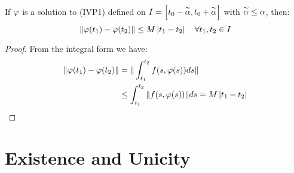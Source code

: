 
\begin{proposition}[]
If $\varphi  $ is a solution to (IVP1) defined on $I = \left[ t_0 - \overset{\sim}{\alpha} , t_0  + \overset{\sim}{\alpha}  \right] $ 
with $\overset{\sim}{\alpha}  \leq  \alpha $, then: 
\[
\| \varphi (t_1)  - \varphi (t_2)  \|  \leq  M \left| t_1-t_2 \right| 
\quad \forall t_1, t_2 \in  I
\]
\end{proposition}
\begin{proof}
From the integral form we have: 
\begin{align*}
  \| \varphi (t_1)  - \varphi (t_2)  \|  &= 
  \| \int_{t_1}^{t_2} f(s, \varphi (s) ) ds  \|  
  \\
                                 &\leq  
  \int_{t_1}^{t_2}  
  \| f(s, \varphi (s) )  \|  ds = M \left| t_1 - t_2 \right|
\end{align*}
\end{proof}
\section{Existence and Unicity}
